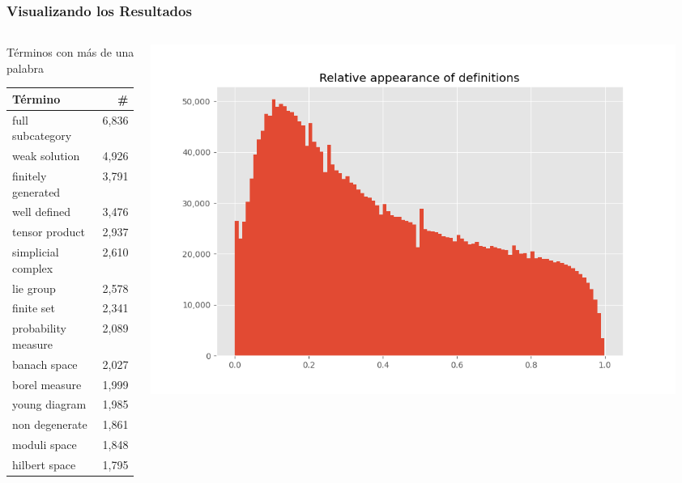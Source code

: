 \documentclass[10pt]{beamer}
\begin{document}
\begin{frame}
    \frametitle{Visualizando los Resultados}
    \begin{columns}
        \begin{column}{0.4\textwidth}
        Términos con más de una palabra\\
            \begin{tabular}{lr}
                \toprule
                \textbf{Término} & \textbf{\#}  \\
                \midrule
full subcategory &  6,836 \\
weak solution &  4,926 \\
finitely generated &  3,791 \\
well defined &  3,476 \\
tensor product &  2,937 \\
simplicial complex &  2,610 \\
lie group &  2,578 \\
finite set &  2,341 \\
probability measure &  2,089 \\
banach space &  2,027 \\
borel measure &  1,999 \\
young diagram &  1,985 \\
non degenerate &  1,861 \\
moduli space &  1,848 \\
hilbert space &  1,795 \\
\bottomrule
            \end{tabular}
        \end{column}
        \begin{column}{0.6\textwidth}
            \begin{center}
                \includegraphics[width=0.95\textwidth]{../Images/rel_appe.png}


\end{center}
\end{column}
\end{columns}
\end{frame}
\end{document}
